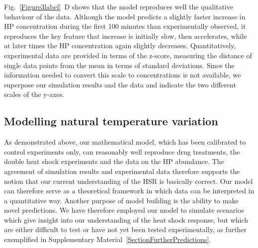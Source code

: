 \documentclass[oneside, 10pt, a4paper, twocolumn]{article}
\begin{document}
Fig.~\ref{Figure3label}~D shows that the model reproduces well the qualitative behaviour of the data.
Although the model predicts a slightly faster increase in HP concentration during the first
100 minutes than experimentally observed, it reproduces the key feature that increase is initially slow,
then accelerates, while at later times the HP concentration again slightly decreases. 
Quantitatively, experimental data are provided in terms of the z-score, 
measuring the distance of single data points from the mean in terms of standard deviations. 
Since the information needed to convert this scale to concentrations is not available, 
we superpose our simulation results and the data and  indicate the two different  scales of the y-axes. %





\subsection{Modelling natural temperature variation}
\label{SecHotDay}
\label{MaximalHPtau}

As demonstrated above, our mathematical model, which has been calibrated to control experiments only, 
can reasonably well reproduce drug treatments, the double heat shock experiments and the data on the HP abundance.
The agreement of simulation results and experimental data therefore supports the notion that our current understanding of the HSR is basically correct. Our model can therefore serve as a theoretical framework in which
data can be interpreted in a quantitative way.
Another purpose of model building is the ability to make novel predictions.
We have therefore employed our model to simulate scenarios which give insight into our understanding of the heat shock response, but which are either difficult to test or have not yet been tested experimentally, as further exemplified in {Supplementary Material~\ref{SectionFurtherPredictions}}.
\end{document}
